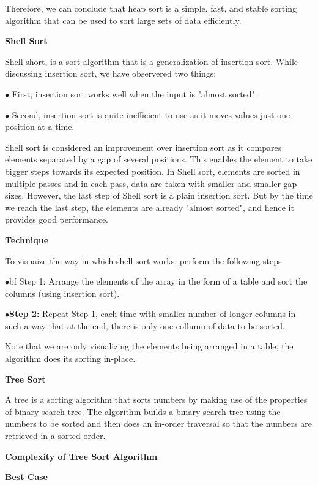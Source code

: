 \vskip 1mm
Therefore, we can conclude that heap sort is a simple, fast, and stable sorting algorithm that can be used to sort large sets of data efficiently.

\filbreak
\vskip 1cm
{\bf Shell Sort}

\vskip 1mm
Shell short, is a sort algorithm that is a generalization of  insertion sort. While discussing insertion sort, we have observered two things:

\vskip 3mm
\qquad$\bullet$ First, insertion sort works well when the input is "almost sorted".

\vskip 3mm
\qquad$\bullet$ Second, insertion sort is quite inefficient to use as it moves values just one position at a time.

\vskip 3mm
Shell sort is considered an improvement over insertion sort as it compares elements separated by a gap of several positions. This enables the element to take bigger steps towards its expected position. In Shell sort, elements are sorted in multiple passes and in each pass, data are taken with smaller and smaller gap sizes. However, the last step of Shell sort is a plain insertion sort. But by the time we reach the last step, the elements are already "almost sorted", and hence it provides good performance.

\vskip 3mm
{\bf Technique}

\vskip 1mm
To visuaize the way in which shell sort works, perform the following steps:

\vskip 3mm
\qquad$\bullet${bf Step 1:} Arrange the elements of the array in the form of a table and sort the columns (using insertion sort).

\vskip 3mm
\qquad$\bullet${\bf Step 2:} Repeat Step 1, each time with smaller number of longer columns in such a way that at the end, there is only one collumn of data to be sorted.

\vskip 1mm
Note that we are only visualizing the elements being arranged in a table, the algorithm does its sorting in-place.

\filbreak
\vskip 1cm
{\bf Tree Sort}

\vskip 1mm
A tree is a sorting algorithm that sorts numbers by making use of the properties of binary search tree. The algorithm builds a binary search tree using the numbers to be sorted and then does an in-order traversal so that the numbers are retrieved in a sorted order.

\vskip 1mm
{\bf Complexity of Tree Sort Algorithm}

\vskip 1mm
{\bf Best Case}

